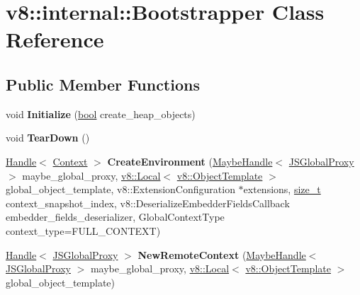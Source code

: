\hypertarget{classv8_1_1internal_1_1Bootstrapper}{}\section{v8\+:\+:internal\+:\+:Bootstrapper Class Reference}
\label{classv8_1_1internal_1_1Bootstrapper}
\subsection*{Public Member Functions}
\begin{DoxyCompactItemize}
\item 
\mbox{\label{classv8_1_1internal_1_1Bootstrapper_a786cfec628cdd9049ac48c335d5ba5a0}} 
void {\bfseries Initialize} (\mbox{\hyperlink{classbool}{bool}} create\+\_\+heap\+\_\+objects)
\item 
\mbox{\label{classv8_1_1internal_1_1Bootstrapper_af547adb8e8d297f7009a1207e36dcd3f}} 
void {\bfseries Tear\+Down} ()
\item 
\mbox{\label{classv8_1_1internal_1_1Bootstrapper_af6077e797974f10673800574aefefedb}} 
\mbox{\hyperlink{classv8_1_1internal_1_1Handle}{Handle}}$<$ \mbox{\hyperlink{classv8_1_1internal_1_1Context}{Context}} $>$ {\bfseries Create\+Environment} (\mbox{\hyperlink{classv8_1_1internal_1_1MaybeHandle}{Maybe\+Handle}}$<$ \mbox{\hyperlink{classv8_1_1internal_1_1JSGlobalProxy}{J\+S\+Global\+Proxy}} $>$ maybe\+\_\+global\+\_\+proxy, \mbox{\hyperlink{classv8_1_1Local}{v8\+::\+Local}}$<$ \mbox{\hyperlink{classv8_1_1ObjectTemplate}{v8\+::\+Object\+Template}} $>$ global\+\_\+object\+\_\+template, v8\+::\+Extension\+Configuration $\ast$extensions, \mbox{\hyperlink{classsize__t}{size\+\_\+t}} context\+\_\+snapshot\+\_\+index, v8\+::\+Deserialize\+Embedder\+Fields\+Callback embedder\+\_\+fields\+\_\+deserializer, Global\+Context\+Type context\+\_\+type=F\+U\+L\+L\+\_\+\+C\+O\+N\+T\+E\+XT)
\item 
\mbox{\label{classv8_1_1internal_1_1Bootstrapper_a14ac9783ba9c68b80fa0f73eab3ee57d}} 
\mbox{\hyperlink{classv8_1_1internal_1_1Handle}{Handle}}$<$ \mbox{\hyperlink{classv8_1_1internal_1_1JSGlobalProxy}{J\+S\+Global\+Proxy}} $>$ {\bfseries New\+Remote\+Context} (\mbox{\hyperlink{classv8_1_1internal_1_1MaybeHandle}{Maybe\+Handle}}$<$ \mbox{\hyperlink{classv8_1_1internal_1_1JSGlobalProxy}{J\+S\+Global\+Proxy}} $>$ maybe\+\_\+global\+\_\+proxy, \mbox{\hyperlink{classv8_1_1Local}{v8\+::\+Local}}$<$ \mbox{\hyperlink{classv8_1_1ObjectTemplate}{v8\+::\+Object\+Template}} $>$ global\+\_\+object\+\_\+template)

\end{DoxyCompactItemize}
